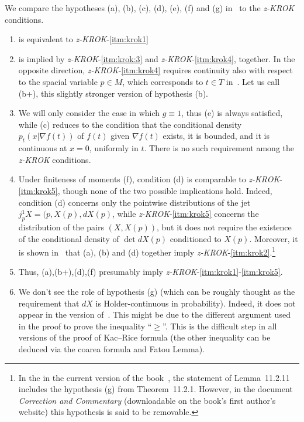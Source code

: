 \documentclass[10pt]{amsart}
\theoremstyle{definition}\newtheorem{defi}[theo]{Definition}\newtheorem{rema}[theo]{Remark}\newtheorem{exam}[theo]{Example}\newtheorem{exem}[theo]{Example}\newtheorem{nota}[theo]{Notation}
\newcommand{\zkrok}{\emph{z-KROK}\xspace}
\newcommand*{\alphenumi}{\renewcommand*{\theenumi}{\alph{enumi}}}
\begin{document}
We compare the hypotheses (a), (b), (c), (d), (e), (f) and (g) in~\cite[Theorem~11.2.1]{AdlerTaylor} to the \zkrok conditions.
\begin{enumerate}\alphenumi
\item is equivalent to \zkrok-\ref{itm:krok1}
\item is implied by \zkrok-\ref{itm:krok:3} and \zkrok-\ref{itm:krok4}, together. In the opposite direction, \zkrok-\ref{itm:krok4} requires continuity also with respect to the spacial variable $p\in M$, which corresponds to $t\in T$ in~\cite{AdlerTaylor}. Let us call (b+), this slightly stronger version of hypothesis (b).
\item We will only consider the case in which $g\equiv 1$, thus (e) is always satisfied, while (c) reduces to the condition that the conditional density $p_t(x|\nabla f(t))$ of $f(t)$ given $\nabla f(t)$ exists, it is bounded, and it is continuous at $x=0$, uniformly in $t$. There is no such requirement among the \zkrok conditions.
\item Under finiteness of moments (f), condition (d) is comparable to \zkrok-\ref{itm:krok5}, though none of the two possible implications hold. Indeed, condition (d) concerns only the pointwise distributions of the jet $j^1_pX=(p,X(p),dX(p)$, while \zkrok-\ref{itm:krok5} concerns the distribution of the pairs $(X,X(p))$, but it does not require the existence of the conditional density of $\det dX(p)$ conditioned to $X(p)$. Moreover, it is shown in~\cite[Lemma~11.2.11]{AdlerTaylor} that (a), (b) and (d) together imply \zkrok-\ref{itm:krok2}.\footnote{In the in the current version of the book~\cite{AdlerTaylor}, the statement of Lemma~11.2.11 includes the hypothesis (g) from Theorem~11.2.1. However, in the document \emph{Correction and Commentary} (downloadable on the book's first author's website) this hypothesis is said to be removable. }
\item Thus, (a),(b+),(d),(f) presumably imply \zkrok-\ref{itm:krok1}-\ref{itm:krok5}.
\item We don't see the role of hypothesis (g) (which can be roughly thought as the requirement that $dX$ is Holder-continuous in probability). Indeed, it does not appear in the version of~\cite{AzaisWscheborbook}. This might be due to the different argument used in the proof to prove the inequality ``$\ge$''. This is the difficult step in all versions of the proof of Kac--Rice formula (the other inequality can be deduced via the coarea formula and Fatou Lemma).
\end{enumerate}
\end{document}
